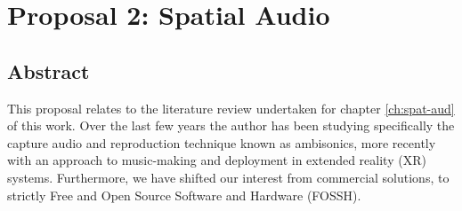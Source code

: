 \chapter{Proposal 2: Spatial Audio} \label{ch:prop-trs}









%




\section{Abstract}

This proposal relates to the literature review undertaken for chapter \ref{ch:spat-aud} of this work. Over the last few years the author has been studying specifically the capture audio and reproduction technique known as ambisonics, more recently with an approach to music-making and deployment in extended reality (XR) systems. Furthermore, we have shifted our interest from commercial solutions, to strictly Free and Open Source Software and Hardware (FOSSH).

